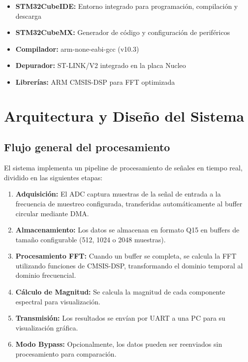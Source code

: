 \documentclass[12pt]{article}
\begin{document}
				\begin{itemize}
					\item \textbf{STM32CubeIDE:} Entorno integrado para programación, compilación y descarga
					\item \textbf{STM32CubeMX:} Generador de código y configuración de periféricos
					\item \textbf{Compilador:} arm-none-eabi-gcc (v10.3)
					\item \textbf{Depurador:} ST-LINK/V2 integrado en la placa Nucleo
					\item \textbf{Librerías:} ARM CMSIS-DSP para FFT optimizada
				\end{itemize}


	\section{Arquitectura y Diseño del Sistema}

		\subsection{Flujo general del procesamiento}

			El sistema implementa un pipeline de procesamiento de señales en tiempo real, dividido en las siguientes etapas:

			\begin{enumerate}
				\item \textbf{Adquisición:} El ADC captura muestras de la señal de entrada a la frecuencia de muestreo configurada, transferidas automáticamente al buffer circular mediante DMA.
				
				\item \textbf{Almacenamiento:} Los datos se almacenan en formato Q15 en buffers de tamaño configurable (512, 1024 o 2048 muestras).
				
				\item \textbf{Procesamiento FFT:} Cuando un buffer se completa, se calcula la FFT utilizando funciones de CMSIS-DSP, transformando el dominio temporal al dominio frecuencial.
				
				\item \textbf{Cálculo de Magnitud:} Se calcula la magnitud de cada componente espectral para visualización.
				
				\item \textbf{Transmisión:} Los resultados se envían por UART a una PC para su visualización gráfica.
				
				\item \textbf{Modo Bypass:} Opcionalmente, los datos pueden ser reenviados sin procesamiento para comparación.
			\end{enumerate}
\end{document}
